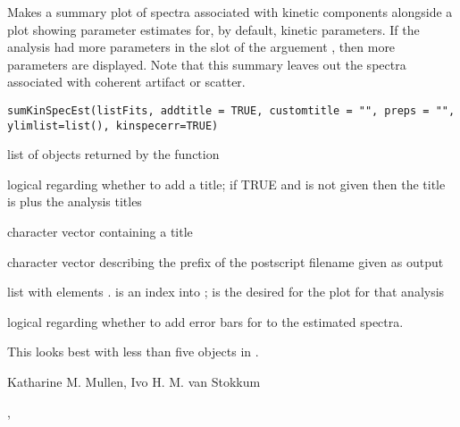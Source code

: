 \begin{Description}\relax
Makes a summary plot of spectra associated with kinetic components
alongside a plot showing parameter estimates for, by default, kinetic 
parameters.  If the analysis had more parameters in the  slot 
of the arguement , then more parameters are displayed. 
Note that this summary leaves out the spectra associated with coherent 
artifact or scatter.
\end{Description}
\begin{Usage}
\begin{verbatim}
sumKinSpecEst(listFits, addtitle = TRUE, customtitle = "", preps = "", 
ylimlist=list(), kinspecerr=TRUE)
\end{verbatim}
\end{Usage}
\begin{Arguments}
\begin{ldescription}
\item[\code{listFits}] list of objects returned by the  function
\item[\code{addtitle}] logical regarding whether to add a title; if TRUE and
 is not given then the title is  
 plus the analysis titles
\item[\code{customtitle}] character vector containing a title
\item[\code{preps}] character vector describing the prefix of the postscript
filename given as output
\item[\code{ylimlist}] list with elements .   is
an index into ;  is the desired  for
the plot for that analysis
\item[\code{kinspecerr}] logical regarding whether to add error bars for to the 
estimated spectra. 

\end{ldescription}
\end{Arguments}
\begin{Details}\relax
This looks best with less than five objects in .
\end{Details}
\begin{Value}
\end{Value}
\begin{Author}\relax
Katharine M. Mullen, Ivo H. M. van Stokkum
\end{Author}
\begin{SeeAlso}\relax
{}, 
\end{SeeAlso}

